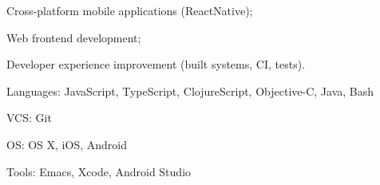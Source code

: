 \documentclass[11pt,a4paper,sans]{awesomecv}
\begin{document}
\makecvheader[C]

\begin{cvitems}
\item{Cross-platform mobile applications (ReactNative);}
\item{Web frontend development;}
\item{Developer experience improvement (built systems, CI, tests).}
\end{cvitems}

\begin{cvitems}
\item{Languages: JavaScript, TypeScript, ClojureScript, Objective-C, Java, Bash}
\item{VCS: Git}
\item{OS: OS X, iOS, Android}
\item{Tools: Emacs, Xcode, Android Studio}
\end{cvitems}

\renewcommand*{\entrypositionstyle}[1]{{\fontsize{10pt}{1em}\bodyfont\bfseries\color{darktext} #1}}
\renewcommand*{\entrydatestyle}[1]{{\fontsize{9pt}{1em}\bodyfontlight\slshape\color{graytext} #1}}
\newcommand*{\entryemployerstyle}[1]{{\fontsize{9pt}{1em}\bodyfont\bfseries\color{graytext} #1}}
\newcommand*{\entryurlstyle}[1]{{\fontsize{9pt}{1em}\bodyfontlight\upshape\color{graytext} #1}}
\newcommand*{\entrydescriptionstyle}[1]{{\fontsize{10pt}{1em}\bodyfont\upshape\color{text} #1}}
\renewcommand*{\cventry}[5]{
  \setlength\tabcolsep{0pt}
  \setlength{\extrarowheight}{0pt}
  \begin{tabular*}{\textwidth}{@{\extracolsep{\fill}} l r}
    \entrypositionstyle{#1} & \entrydatestyle{#2} \\
    \entryemployerstyle{#3} & \entryurlstyle{\url{#4}} \\
    \multicolumn{2}{L{\textwidth}}{
      \entrydescriptionstyle{#5}
    }
  \end{tabular*}
}

\newenvironment{cvprojects}[1] {%
  \ifthenelse{\equal{#1}{}}{
    \begin{description}[
      itemindent=0em,
      labelwidth=0em,
      labelsep=0em,
      leftmargin=0em,
      parsep=1ex
    ]
  }{
    \begin{description}[
      itemindent=0em,
      labelwidth=0em,
      labelsep=0em,
      leftmargin=0em,
      parsep=1ex,
      topsep=#1
    ]
  }
}{%
  \end{description}
}
\end{document}
